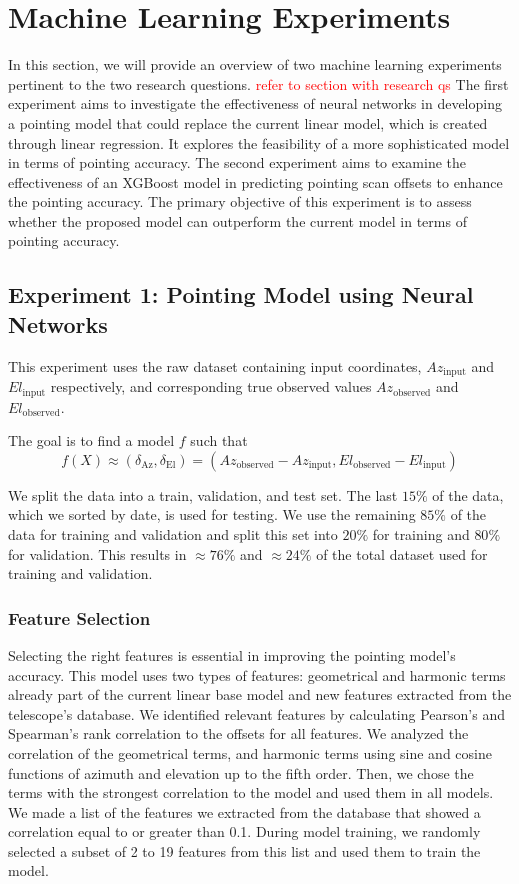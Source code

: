 \section{Machine Learning Experiments}\label{sec:ml_exp}
In this section, we will provide an overview of two machine learning experiments pertinent to the two research questions. \textcolor{red}{refer to section with research qs}
The first experiment aims to investigate the effectiveness of neural networks in developing a pointing model that could replace the current linear model, which is created through linear regression.
It explores the feasibility of a more sophisticated model in terms of pointing accuracy.
The second experiment aims to examine the effectiveness of an XGBoost model in predicting pointing scan offsets to enhance the pointing accuracy.
The primary objective of this experiment is to assess whether the proposed model can outperform the current model in terms of pointing accuracy.

\subsection{Experiment 1: Pointing Model using Neural Networks}
This experiment uses the raw dataset containing input coordinates, $Az_{\text{input}}$ and $El_{\text{input}}$ respectively, and corresponding true observed values $Az_{\text{observed}}$ and $El_{\text{observed}}$.

The goal is to find a model $f$ such that
\begin{equation}
    f(X) \approx (\delta_{\text{Az}}, \delta_{\text{El}}) = (Az_{\text{observed}}-Az_{\text{input}}, El_{\text{observed}}-El_{\text{input}})
\end{equation}

We split the data into a train, validation, and test set.
The last $15\%$ of the data, which we sorted by date, is used for testing.
We use the remaining $85\%$ of the data for training and validation and split this set into $20\%$ for training and $80\%$ for validation.
This results in $\approx 76\%$ and $\approx 24\%$ of the total dataset used for training and validation.

\subsubsection{Feature Selection}
Selecting the right features is essential in improving the pointing model's accuracy.
This model uses two types of features: geometrical and harmonic terms already part of the current linear base model and new features extracted from the telescope's database.
We identified relevant features by calculating Pearson's and Spearman's rank correlation to the offsets for all features.
We analyzed the correlation of the geometrical terms, and harmonic terms using sine and cosine functions of azimuth and elevation up to the fifth order.
Then, we chose the terms with the strongest correlation to the model and used them in all models.
We made a list of the features we extracted from the database that showed a correlation equal to or greater than 0.1.
During model training, we randomly selected a subset of 2 to 19 features from this list and used them to train the model.

